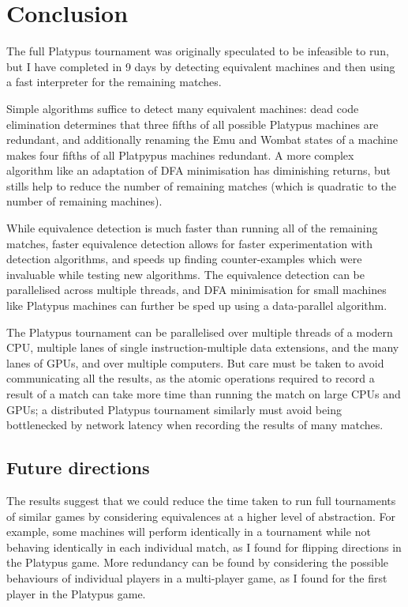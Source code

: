 \chapter{Conclusion}

The full Platypus tournament was originally speculated to be infeasible to
run, but I have completed in 9 days by detecting equivalent machines and
then using a fast interpreter for the remaining matches.

Simple algorithms suffice to detect many equivalent machines: dead
code elimination determines that three fifths of all possible Platypus
machines are redundant, and additionally renaming the Emu and
Wombat states of a machine makes four fifths of all Platpypus machines
redundant. A more complex algorithm like an adaptation of DFA
minimisation has diminishing returns, but stills help to reduce the
number of remaining matches (which is quadratic to the number of
remaining machines).

While equivalence detection is much faster than running all of the
remaining matches, faster equivalence detection allows for faster
experimentation with detection algorithms, and speeds up finding
counter-examples which were invaluable while testing new algorithms.
The equivalence detection can be parallelised across multiple threads,
and DFA minimisation for small machines like Platypus machines
can further be sped up using a data-parallel algorithm.

The Platypus tournament can be parallelised over multiple threads of a
modern CPU, multiple lanes of single instruction-multiple data extensions,
and the many lanes of GPUs, and over multiple computers. But care must
be taken to avoid communicating all the results, as the atomic operations
required to record a result of a match can take more time than running
the match on large CPUs and GPUs; a distributed Platypus tournament
similarly must avoid being bottlenecked by network latency when recording
the results of many matches.

\section{Future directions}

The results suggest that we could reduce the time taken to run full
tournaments of similar games by considering equivalences at a higher
level of abstraction. For example, some machines will perform identically
in a tournament while not behaving identically in each individual match,
as I found for flipping directions in the Platypus game. More redundancy
can be found by considering the possible behaviours of individual players in a
multi-player game, as I found for the first player in the Platypus game.

